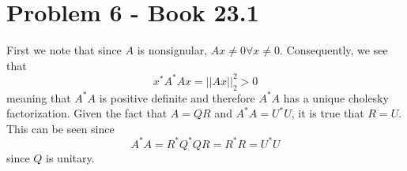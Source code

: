 \documentclass[12pt,a4paper,twoside]{article}
\begin{document}
\section{Problem 6 - Book 23.1}
First we note that since $A$ is nonsignular, $Ax\neq 0 \forall x\neq0$. Consequently, we see that 
\begin{equation}
x^*A^* Ax=||Ax||_2^2>0
\end{equation}
meaning that $A^*A$ is positive definite and therefore $A^*A$ has a unique cholesky factorization.
Given the fact that $A=QR$ and $A^*A=U^* U$, it is true that $R=U$. This can be seen since
\begin{equation}
A^*A=R^*Q^* QR =R^* R=U^* U
\end{equation} since $Q$ is unitary. 
\end{document}
